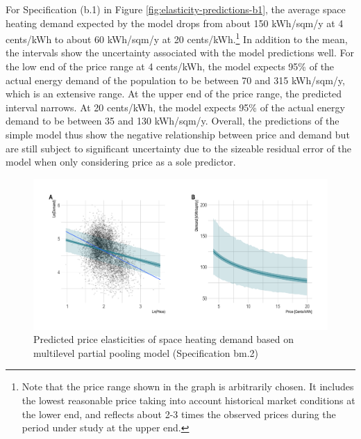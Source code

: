 \documentclass[12pt,twoside]{reedthesis}
\begin{document}
For Specification (b.1) in Figure \ref{fig:elasticity-predictions-b1}, the average space heating demand expected by the model drops from about 150 kWh/sqm/y at 4 cents/kWh to about 60 kWh/sqm/y at 20 cents/kWh.\footnote{Note that the price range shown in the graph is arbitrarily chosen. It includes the lowest reasonable price taking into account historical market conditions at the lower end, and reflects about 2-3 times the observed prices during the period under study at the upper end.} In addition to the mean, the intervals show the uncertainty associated with the model predictions well. For the low end of the price range at 4 cents/kWh, the model expects 95\% of the actual energy demand of the population to be between 70 and 315 kWh/sqm/y, which is an extensive range. At the upper end of the price range, the predicted interval narrows. At 20 cents/kWh, the model expects 95\% of the actual energy demand to be between 35 and 130 kWh/sqm/y. Overall, the predictions of the simple model thus show the negative relationship between price and demand but are still subject to significant uncertainty due to the sizeable residual error of the model when only considering price as a sole predictor.
\begin{figure}

{\centering \includegraphics[width=1.04\linewidth]{figure/bm2_prediction} 

}

\caption{Predicted price elasticities of space heating demand based on multilevel partial pooling model (Specification bm.2)}\label{fig:elasticity-predictions-bm2}
\end{figure}
\end{document}

